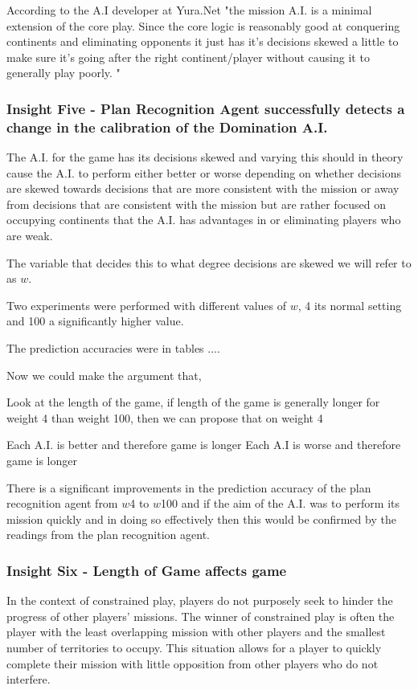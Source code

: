 \documentclass[parskip]{cs4rep}
\begin{document}
According to the A.I developer at Yura.Net "the mission A.I. is a minimal extension of the core play. Since the core logic is reasonably good at conquering continents and eliminating opponents it just has it's decisions skewed a little to make sure it's going after the right continent/player without causing it to generally play poorly. "

\subsubsection{Insight Five - Plan Recognition Agent successfully detects a change in the calibration of the Domination A.I.}

The A.I. for the game has its decisions skewed and varying this should in theory cause the A.I. to perform either better or worse depending on whether decisions are skewed towards decisions that are more consistent with the mission or away from decisions that are consistent with the mission but are rather focused on occupying continents that the A.I. has advantages in or eliminating players who are weak.

The variable that decides this to what degree decisions are skewed we will refer to as $w$.

Two experiments were performed with different values of $w$, 4 its normal setting and 100 a significantly higher value.

The prediction accuracies were in tables ....

Now we could make the argument that, 

Look at the length of the game, if length of the game is generally longer for weight 4 than weight 100, then we can propose that on weight 4

Each A.I. is better and therefore game is longer
Each A.I is worse and therefore game is longer

There is a significant improvements in the prediction accuracy of the plan recognition agent from $w$4 to $w$100 and if the aim of the A.I. was to perform its mission quickly and in doing so effectively then this would be confirmed by the readings from the plan recognition agent.

\subsubsection{Insight Six - Length of Game affects game}

In the context of constrained play, players do not purposely seek to hinder the progress of other players' missions. The winner of constrained play is often the player with the least overlapping mission with other players and the smallest number of territories to occupy. This situation allows for a player to quickly complete their mission with little opposition from other players who do not interfere.
\end{document}
